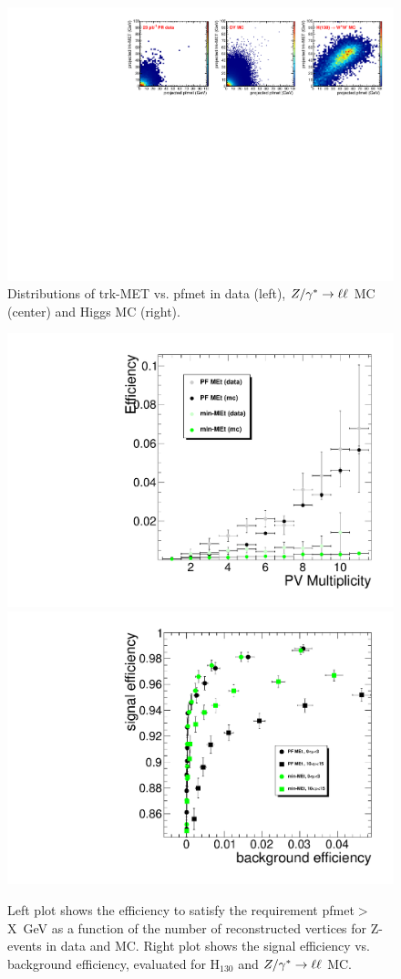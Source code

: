\begin{figure}[hbt]
\begin{center}
\includegraphics[width=1\linewidth]{figures/met_scatter.pdf} 
\caption{\label{fig:met_scatter}\protect Distributions of trk-MET vs. pfmet in data (left), $Z/\gamma^*\to\ell\ell$ MC (center) and Higgs MC (right).}
\end{center}
\end{figure}

\begin{figure}[hbt]
\begin{center}
\includegraphics[width=0.45\linewidth]{figures/pfmet_minmet_Eff30.pdf} 
\includegraphics[width=0.45\linewidth]{figures/SignalVsBkgrEfficiency.pdf} 
\caption{\label{fig:met_eff}\protect Left plot shows the efficiency to satisfy
 the requirement pfmet$>$X~GeV as a function of the number of reconstructed 
vertices for Z-events in data and MC. Right plot shows the signal efficiency 
vs. background efficiency, evaluated for H$_{130}$ and $Z/\gamma^*\to\ell\ell$ MC.}
\end{center}
\end{figure}



